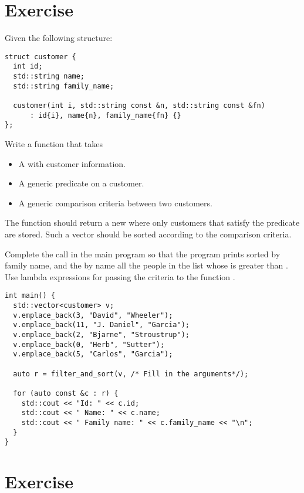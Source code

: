 \section{Exercise }
\label{ej:lambdafiltro}

Given the following  structure:
\begin{lstlisting}
struct customer {
  int id;
  std::string name;
  std::string family_name;

  customer(int i, std::string const &n, std::string const &fn)
      : id{i}, name{n}, family_name{fn} {}
};
\end{lstlisting}

Write a function  that takes
\begin{itemize}
\item A  with customer information.
\item A generic predicate on a customer.
\item A generic comparison criteria between two customers.
\end{itemize}

The function should return a new  where only customers that satisfy the predicate are stored. Such a vector should be sorted according to the comparison criteria.

Complete the call  in the main program so that
the program prints sorted by family name, and the by name all the people in the list
whose  is greater than .
Use lambda expressions for passing the criteria to the function .
\begin{lstlisting}
int main() {
  std::vector<customer> v;
  v.emplace_back(3, "David", "Wheeler");
  v.emplace_back(11, "J. Daniel", "Garcia");
  v.emplace_back(2, "Bjarne", "Stroustrup");
  v.emplace_back(0, "Herb", "Sutter");
  v.emplace_back(5, "Carlos", "Garcia");

  auto r = filter_and_sort(v, /* Fill in the arguments*/);

  for (auto const &c : r) {
    std::cout << "Id: " << c.id;
    std::cout << " Name: " << c.name;
    std::cout << " Family name: " << c.family_name << "\n";
  }
}
\end{lstlisting}

\section{Exercise }

